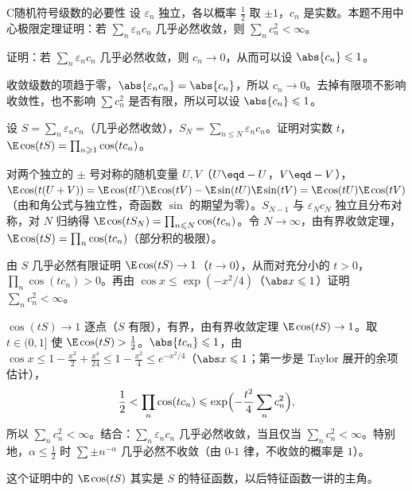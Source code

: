 \thinkingpart

\begin{probleme}[问题]{C}{随机符号级数的必要性}
设 $\varepsilon_n$ 独立，各以概率 $\frac12$ 取 $\pm1$，$c_n$ 是实数。本题不用中心极限定理证明：若 $\sum_n\varepsilon_nc_n$ 几乎必然收敛，则 $\sum_nc_n^2<\infty$。
\begin{questions}
\item 证明：若 $\sum_n\varepsilon_nc_n$ 几乎必然收敛，则 $c_n\to0$，从而可以设 $\abs{c_n}\leqslant1$。
\begin{solution}
收敛级数的项趋于零，$\abs{\varepsilon_nc_n}=\abs{c_n}$，所以 $c_n\to0$。去掉有限项不影响收敛性，也不影响 $\sum c_n^2$ 是否有限，所以可以设 $\abs{c_n}\leqslant1$。
\end{solution}
\item 设 $S=\sum_n\varepsilon_nc_n$（几乎必然收敛），$S_N=\sum_{n\leqslant N}\varepsilon_nc_n$。证明对实数 $t$，$\E\cos(tS)=\prod_{n\geqslant1}\cos(tc_n)$。
\begin{solution}
对两个独立的 $\pm$ 号对称的随机变量 $U,V$（$U\eqd-U$，$V\eqd-V$），$\E\cos(t(U+V))=\E\cos(tU)\E\cos(tV)-\E\sin(tU)\E\sin(tV)=\E\cos(tU)\E\cos(tV)$（由和角公式与独立性，奇函数 $\sin$ 的期望为零）。$S_{N-1}$ 与 $\varepsilon_Nc_N$ 独立且分布对称，对 $N$ 归纳得 $\E\cos(tS_N)=\prod_{n\leqslant N}\cos(tc_n)$。令 $N\to\infty$，由有界收敛定理，$\E\cos(tS)=\prod_n\cos(tc_n)$（部分积的极限）。
\end{solution}
\item 由 $S$ 几乎必然有限证明 $\E\cos(tS)\to1$（$t\to0$），从而对充分小的 $t>0$，$\prod_n\cos(tc_n)>0$。再由 $\cos x\leqslant\exp(-x^2/4)$（$\abs x\leqslant1$）证明 $\sum_nc_n^2<\infty$。
\begin{solution}
$\cos(tS)\to1$ 逐点（$S$ 有限），有界，由有界收敛定理 $\E\cos(tS)\to1$。取 $t\in(0,1]$ 使 $\E\cos(tS)>\frac12$。$\abs{tc_n}\leqslant1$，由 $\cos x\leqslant1-\frac{x^2}2+\frac{x^4}{24}\leqslant1-\frac{x^2}4\leqslant e^{-x^2/4}$（$\abs x\leqslant1$；第一步是 Taylor 展开的余项估计），
\[
\frac12<\prod_n\cos(tc_n)\leqslant\exp\Bigl(-\frac{t^2}4\sum_nc_n^2\Bigr),
\]
所以 $\sum_nc_n^2<\infty$。结合：$\sum_n\varepsilon_nc_n$ 几乎必然收敛，当且仅当 $\sum_nc_n^2<\infty$。特别地，$\alpha\leqslant\frac12$ 时 $\sum\pm n^{-\alpha}$ 几乎必然不收敛（由 $0$-$1$ 律，不收敛的概率是 $1$）。

这个证明中的 $\E\cos(tS)$ 其实是 $S$ 的特征函数，以后特征函数一讲的主角。
\end{solution}
\end{questions}
\end{probleme}

